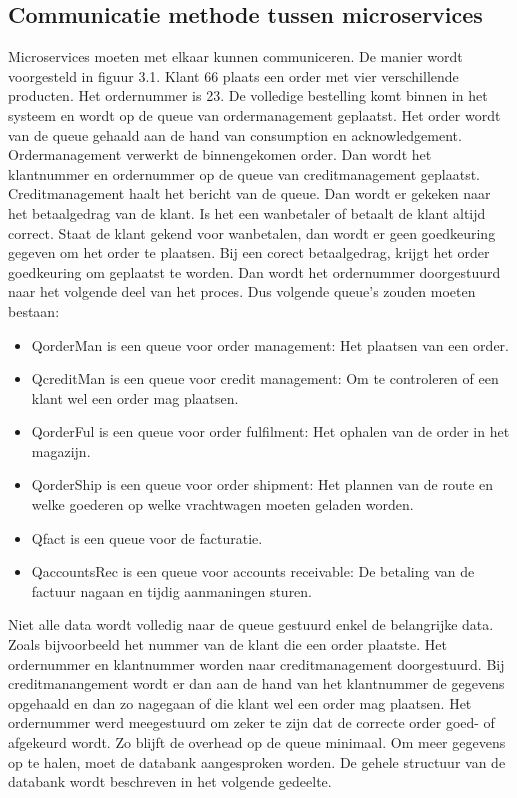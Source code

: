 \subsection{Communicatie methode tussen microservices}

Microservices moeten met elkaar kunnen communiceren. De manier wordt voorgesteld in figuur 3.1. 
Klant 66 plaats een order met vier verschillende producten. Het ordernummer is 23. De volledige bestelling komt binnen in het systeem en wordt op de queue van ordermanagement geplaatst. Het order wordt van de queue gehaald aan de hand van consumption en acknowledgement. Ordermanagement verwerkt de binnengekomen order. Dan wordt het klantnummer en ordernummer op de queue van creditmanagement geplaatst. Creditmanagement haalt het bericht van de queue. Dan wordt er gekeken naar het betaalgedrag van de klant. Is het een wanbetaler of betaalt de klant altijd correct. Staat de klant gekend voor wanbetalen, dan wordt er geen goedkeuring gegeven om het order te plaatsen. Bij een corect betaalgedrag, krijgt het order goedkeuring om geplaatst te worden. Dan wordt het ordernummer doorgestuurd naar het volgende deel van het proces. 
Dus volgende queue's zouden moeten bestaan:
\begin{itemize}
	\item QorderMan is een queue voor order management: Het plaatsen van een order.
	\item QcreditMan is een queue voor credit management: Om te controleren of een klant wel een order mag plaatsen.
	\item QorderFul is een queue voor order fulfilment: Het ophalen van de order in het magazijn.
	\item QorderShip is een queue voor order shipment: Het plannen van de route en welke goederen op welke vrachtwagen moeten geladen worden.
	\item Qfact is een queue voor de facturatie.
	\item QaccountsRec is een queue voor accounts receivable: De betaling van de factuur nagaan en tijdig aanmaningen sturen. 
\end{itemize}

Niet alle data wordt volledig naar de queue gestuurd enkel de belangrijke data. Zoals bijvoorbeeld het nummer van de klant die een order plaatste. Het ordernummer en klantnummer worden naar creditmanagement doorgestuurd. Bij creditmanangement wordt er dan aan de hand van het klantnummer de gegevens opgehaald en dan zo nagegaan of die klant wel een order mag plaatsen. Het ordernummer werd meegestuurd om zeker te zijn dat de correcte order goed- of afgekeurd wordt. Zo blijft de overhead op de queue minimaal. Om meer gegevens op te halen, moet de databank aangesproken worden. De gehele structuur van de databank wordt beschreven in het volgende gedeelte.

